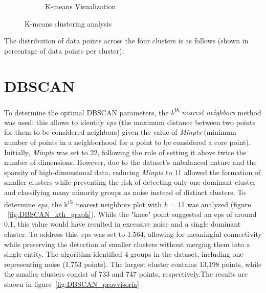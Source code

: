 \begin{figure}[H]
\begin{subfigure}[b]{0.49\textwidth}
        \caption{K-means Visualization}
        \label{fig:pairplot_kmeans}
    \end{subfigure}
    \caption{K-means clustering analysis}
    \label{fig:three_subplots}
\end{figure}
The distribution of data points across the four clusters is as follows (shown in percentage of data points per cluster):



\section{DBSCAN}\label{sec:density_based}
To determine the optimal DBSCAN parameters, the \textit{k\textsuperscript{th} nearest neighbors} method was used: this allows to identify \textit{eps} (the maximum distance between two points for them to be considered neighbors) given the value of \textit{Minpts} (minimum number of points in a neighborhood for a point to be considered a core point).
Initially, \textit{Minpts} was set to 22, following the rule of setting it above twice the number of dimensions. 
However, due to the dataset's unbalanced nature and the sparsity of high-dimensional data, reducing \textit{Minpts} to 11 allowed the formation of smaller clusters while preventing the risk of detecting only one dominant cluster and classifying many minority groups as noise instead of distinct clusters.
To determine \textit{eps}, the k\textsuperscript{th} nearest neighbors plot with \textit{k} = 11 was analyzed (figure ~\ref{fig:DBSCAN_kth_graph}). While the "knee" point suggested an eps of around 0.1, this value would have resulted in excessive noise and a single dominant cluster. 
To address this, eps was set to 1.564, allowing for meaningful connectivity while preserving the detection of smaller clusters without merging them into a single entity. 
The algorithm identified 4 groups in the dataset, including one representing noise (1,753 points). 
The largest cluster contains 13,198 points, while the smaller clusters consist of 733 and 747 points, 
respectively.The  results are shown in figure~\ref{fig:DBSCAN_provvisoria}

